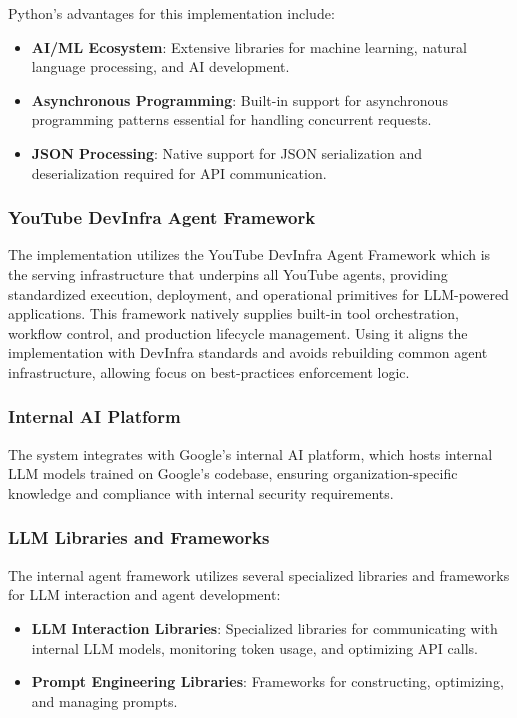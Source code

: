 \begin{spacing}{1.2}
Python's advantages for this implementation include:
\begin{itemize}
    \item \textbf{AI/ML Ecosystem}: Extensive libraries for machine learning, natural language processing, and AI development.
    \item \textbf{Asynchronous Programming}: Built-in support for asynchronous programming patterns essential for handling concurrent requests.
    \item \textbf{JSON Processing}: Native support for JSON serialization and deserialization required for API communication.
\end{itemize}


\subsubsection{YouTube DevInfra Agent Framework}
The implementation utilizes the YouTube DevInfra Agent Framework which is the serving infrastructure that underpins all YouTube agents, providing standardized execution, deployment, and operational primitives for LLM-powered applications. This framework natively supplies built-in tool orchestration, workflow control, and production lifecycle management. Using it aligns the implementation with DevInfra standards and avoids rebuilding common agent infrastructure, allowing focus on best-practices enforcement logic.



\subsubsection{Internal AI Platform}
The system integrates with Google's internal AI platform, which hosts internal LLM models trained on Google's codebase, ensuring organization-specific knowledge and compliance with internal security requirements.


\subsubsection{LLM Libraries and Frameworks}
The internal agent framework utilizes several specialized libraries and frameworks for LLM interaction and agent development:

\begin{itemize}
    \item \textbf{LLM Interaction Libraries}: Specialized libraries for communicating with internal LLM models, monitoring token usage, and optimizing API calls.
    \item \textbf{Prompt Engineering Libraries}: Frameworks for constructing, optimizing, and managing prompts.
\end{itemize}


\end{spacing}
